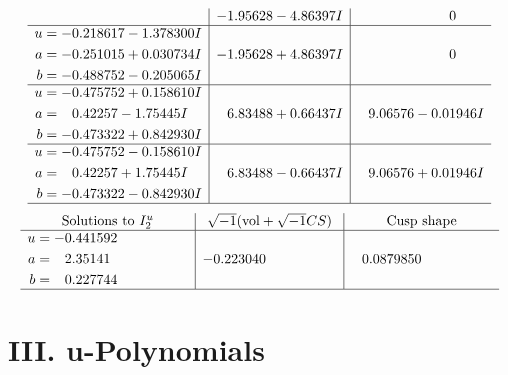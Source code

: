 \documentclass[1p]{elsarticle_modified}
\theoremstyle{definition}
\newcommand{\I}{\sqrt{-1}}
\begin{document}
$$\begin{array}{c|c|c}
 & -1.95628 - 4.86397 I & \phantom{-0.000000 } 0 \\ \hline\begin{aligned}
u &= -0.218617 - 1.378300 I \\
a &= -0.251015 + 0.030734 I \\
b &= -0.488752 - 0.205065 I\end{aligned}
 & -1.95628 + 4.86397 I & \phantom{-0.000000 } 0 \\ \hline\begin{aligned}
u &= -0.475752 + 0.158610 I \\
a &= \phantom{-}0.42257 - 1.75445 I \\
b &= -0.473322 + 0.842930 I\end{aligned}
 & \phantom{-}6.83488 + 0.66437 I & \phantom{-}9.06576 - 0.01946 I \\ \hline\begin{aligned}
u &= -0.475752 - 0.158610 I \\
a &= \phantom{-}0.42257 + 1.75445 I \\
b &= -0.473322 - 0.842930 I\end{aligned}
 & \phantom{-}6.83488 - 0.66437 I & \phantom{-}9.06576 + 0.01946 I\\
 \hline 
 \end{array}$$\newpage$$\begin{array}{c|c|c}  
\text{Solutions to }I^u_{2}& \I (\text{vol} + \sqrt{-1}CS) & \text{Cusp shape}\\
 \hline 
\begin{aligned}
u &= -0.441592\phantom{ +0.000000I} \\
a &= \phantom{-}2.35141\phantom{ +0.000000I} \\
b &= \phantom{-}0.227744\phantom{ +0.000000I}\end{aligned}
 & -0.223040\phantom{ +0.000000I} & \phantom{-}0.0879850\phantom{ +0.000000I}\\
 \hline 
 \end{array}$$\newpage
\newpage\renewcommand{\arraystretch}{1}
\centering \section*{ III. u-Polynomials}
\end{document}
